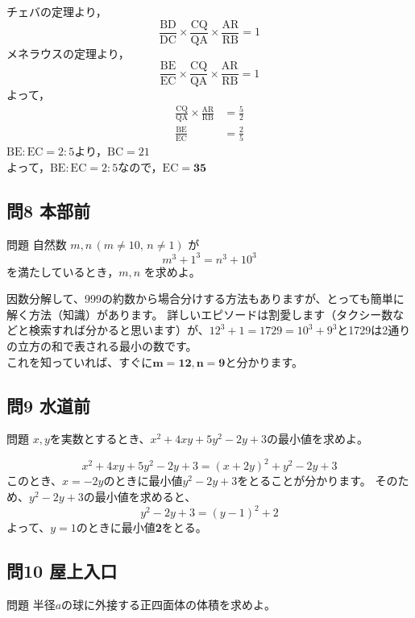 \documentclass[a5paper]{ltjsarticle}
\begin{document}
チェバの定理より，\[\frac{\mathrm{BD}}{\mathrm{DC}}\times \frac{\mathrm{CQ}}{\mathrm{QA}}\times \frac{\mathrm{AR}}{\mathrm{RB}}=1\]
メネラウスの定理より，
\[ \frac{\mathrm{BE}}{\mathrm{EC}}\times \frac{\mathrm{CQ}}{\mathrm{QA}}\times \frac{\mathrm{AR}}{\mathrm{RB}}=1\]
よって，
\begin{align*}
  \frac{\mathrm{CQ}}{\mathrm{QA}}\times \frac{\mathrm{AR}}{\mathrm{RB}}&=\frac{5}{2}\\
  \frac{\mathrm{BE}}{\mathrm{EC}}&=\frac{2}{5}
\end{align*}
$\mathrm{BE}:\mathrm{EC}=2:5$より，$\mathrm{BC}=21$\\
よって，$\mathrm{BE}:\mathrm{EC}=2:5$なので，$\mathrm{EC}=\mathbf{35}$


\subsection*{問8 本部前}
\begin{itembox}[l]{問題}
  自然数 $ m, n\, (m\neq 10,\, n\neq 1)$ が
  \[ m^3+1^3=n^3+10^3\]
  を満たしているとき，$ m, n$ を求めよ。
\end{itembox}

因数分解して、999の約数から場合分けする方法もありますが、とっても簡単に解く方法（知識）があります。
詳しいエピソードは割愛します（タクシー数などと検索すれば分かると思います）が、$12^3+1=1729=10^3+9^3$と1729は2通りの立方の和で表される最小の数です。\\
これを知っていれば、すぐに$\bm{m=12,n=9}$と分かります。


\subsection*{問9 水道前}
\begin{itembox}[l]{問題}
  $x,y$を実数とするとき、$x^2+4xy+5y^2 -2y+3$の最小値を求めよ。
\end{itembox}

\[x^2+4xy+5y^2-2y+3={(x+2y)}^2+y^2-2y+3\]
このとき、$x=-2y$のときに最小値$y^2 -2y+3$をとることが分かります。
そのため、$y^2 -2y+3$の最小値を求めると、
\[y^2-2y+3={(y-1)}^2+2\]
よって、$y=1$のときに最小値{\bfseries 2}をとる。


\subsection*{問10 屋上入口}
\begin{itembox}[l]{問題}
  半径$a$の球に外接する正四面体の体積を求めよ。
\end{itembox}
\end{document}
